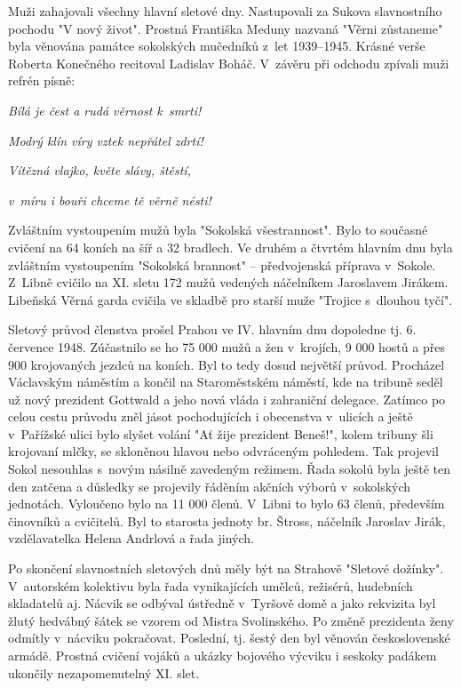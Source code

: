 \documentclass[a5paper, 12pt, twoside]{article}
\begin{document}
Muži zahajovali všechny hlavní sletové dny. Nastupovali za Sukova
slavnostního pochodu "V nový život". Prostná Františka Meduny nazvaná
"Věrni zůstaneme" byla věnována památce sokolských mučedníků z~let
1939--1945. Krásné verše Roberta Konečného recitoval Ladislav
Boháč. V~závěru při odchodu zpívali muži refrén písně:

\textit{Bílá je čest a rudá věrnost k~smrti!}

\textit{Modrý klín víry vztek nepřátel zdrtí!}

\textit{Vítězná vlajko, květe slávy, štěstí,}

\textit{v~míru i bouři chceme tě věrně nésti!}

Zvláštním vystoupením mužů byla "Sokolská všestrannost". Bylo to
současné cvičení na 64 koních na šíř a 32 bradlech. Ve druhém a čtvrtém
hlavním dnu byla zvláštním vystoupením "Sokolská brannost" --
předvojenská příprava v~Sokole. Z~Libně cvičilo na XI. sletu 172 mužů
vedených náčelníkem Jaroslavem Jirákem. Libeňská Věrná garda cvičila ve
skladbě pro starší muže "Trojice s~dlouhou tyčí".

Sletový průvod členstva prošel Prahou ve IV. hlavním dnu dopoledne tj.
6. července 1948. Zúčastnilo se ho 75 000 mužů a žen v~krojích, 9 000
hostů a přes 900 krojovaných jezdců na koních. Byl to tedy dosud
největší průvod. Procházel Václavským náměstím a končil na Staroměstském
náměstí, kde na tribuně seděl už nový prezident Gottwald a jeho nová
vláda i zahraniční delegace. Zatímco po celou cestu průvodu zněl jásot
pochodujících i obecenstva v~ulicích a ještě v~Pařížské ulici bylo
slyšet volání "Ať žije prezident Beneš!{}", kolem tribuny šli krojovaní
mlčky, se skloněnou hlavou nebo odvráceným pohledem. Tak projevil Sokol
nesouhlas s~novým násilně zavedeným režimem. Řada sokolů byla ještě ten
den zatčena a důsledky se projevily řáděním akčních výborů v~sokolských
jednotách. Vyloučeno bylo na 11 000 členů. V~Libni to bylo 63 členů,
především činovníků a cvičitelů. Byl to starosta jednoty br. Štross,
náčelník Jaroslav Jirák, vzdělavatelka Helena Andrlová a řada jiných.

Po skončení slavnostních sletových dnů měly být na Strahově "Sletové
dožínky". V~autorském kolektivu byla řada vynikajících umělců,
režisérů, hudebních skladatelů aj. Nácvik se odbýval ústředně v~Tyršově
domě a jako rekvizita byl žlutý hedvábný šátek se vzorem od Mistra
Svolinského. Po změně prezidenta ženy odmítly v~nácviku pokračovat.
Poslední, tj. šestý den byl věnován československé armádě. Prostná
cvičení vojáků a ukázky bojového výcviku i seskoky padákem ukončily
nezapomenutelný XI. slet.
\end{document}
